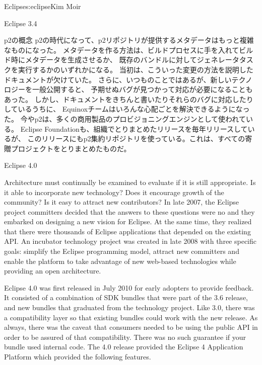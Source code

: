 \begin{aosachapter}{Eclipse}{s:eclipse}{Kim Moir}
\begin{aosasect1}{Eclipse 3.4}
\begin{aosasect2}{p2の概念}
p2の時代になって、p2リポジトリが提供するメタデータはもっと複雑なものになった。
メタデータを作る方法は、ビルドプロセスに手を入れてビルド時にメタデータを生成させるか、
既存のバンドルに対してジェネレータタスクを実行するかのいずれかになる。
当初は、こういった変更の方法を説明したドキュメントが欠けていた。
さらに、いつものことではあるが、新しいテクノロジーを一般公開すると、
予期せぬバグが見つかって対応が必要になることもあった。
しかし、ドキュメントをきちんと書いたりそれらのバグに対応したりしているうちに、
Equinoxチームはいろんな心配ごとを解決できるようになった。
今やp2は、多くの商用製品のプロビジョニングエンジンとして使われている。
Eclipse Foundationも、組織でとりまとめたリリースを毎年リリースしているが、
このリリースにもp2集約リポジトリを使っている。これは、すべての寄贈プロジェクトをとりまとめたものだ。

\end{aosasect2}

\end{aosasect1}

\begin{aosasect1}{Eclipse 4.0}

Architecture must continually be examined to evaluate if it is still
appropriate. Is it able to incorporate new technology? Does it
encourage growth of the community?  Is it easy to attract new
contributors?  In late 2007, the Eclipse project committers decided
that the answers to these questions were no and they embarked on
designing a new vision for Eclipse. At the same time, they realized
that there were thousands of Eclipse applications that depended on the
existing API\@.  An incubator technology project was created in late
2008 with three specific goals: simplify the Eclipse programming
model, attract new committers and enable the platform to take
advantage of new web-based technologies while providing an open
architecture.


Eclipse 4.0 was first released in July 2010 for early adopters to
provide feedback. It consisted of a combination of SDK bundles that
were part of the 3.6 release, and new bundles that graduated from the
technology project.  Like 3.0, there was a compatibility layer so that
existing bundles could work with the new release. As always, there was
the caveat that consumers needed to be using the public API in order
to be assured of that compatibility.  There was no such guarantee if
your bundle used internal code. The 4.0 release provided the Eclipse 4
Application Platform which provided the following features.


\end{aosasect1}
\end{aosachapter}
